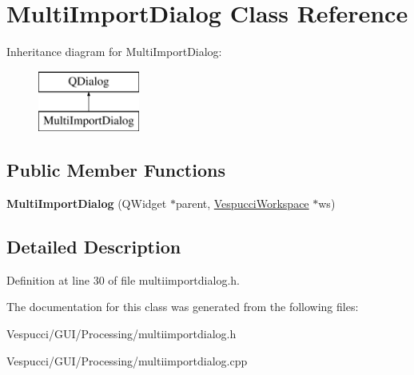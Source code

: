 \hypertarget{class_multi_import_dialog}{}\section{Multi\+Import\+Dialog Class Reference}
\label{class_multi_import_dialog}
Inheritance diagram for Multi\+Import\+Dialog\+:\begin{figure}[H]
\begin{center}
\leavevmode
\includegraphics[height=2.000000cm]{class_multi_import_dialog}
\end{center}
\end{figure}
\subsection*{Public Member Functions}
\begin{DoxyCompactItemize}
\item 
{\bfseries Multi\+Import\+Dialog} (Q\+Widget $\ast$parent, \hyperlink{class_vespucci_workspace}{Vespucci\+Workspace} $\ast$ws)\hypertarget{class_multi_import_dialog_aa4cccc730741a0e1b195266dec3dd9fe}{}\label{class_multi_import_dialog_aa4cccc730741a0e1b195266dec3dd9fe}

\end{DoxyCompactItemize}


\subsection{Detailed Description}


Definition at line 30 of file multiimportdialog.\+h.



The documentation for this class was generated from the following files\+:\begin{DoxyCompactItemize}
\item 
Vespucci/\+G\+U\+I/\+Processing/multiimportdialog.\+h\item 
Vespucci/\+G\+U\+I/\+Processing/multiimportdialog.\+cpp\end{DoxyCompactItemize}
